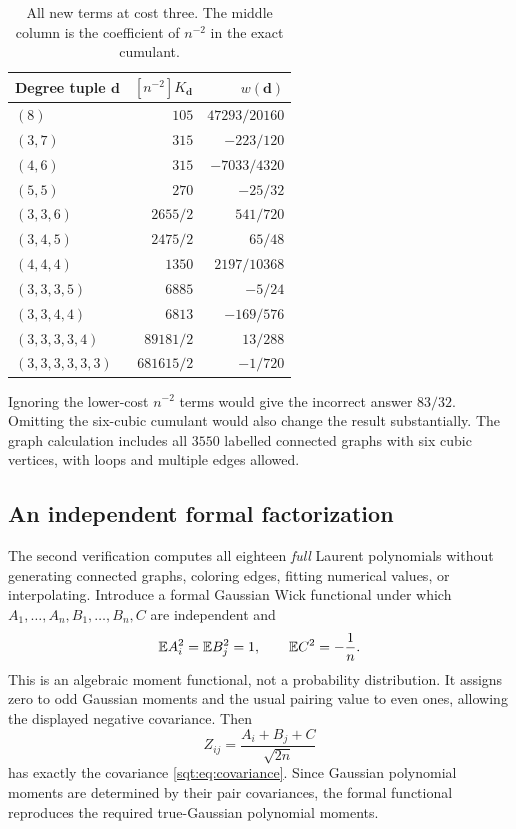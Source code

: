 \begin{table}[htbp]
\centering
\caption{All new terms at cost three. The middle column is the coefficient of $n^{-2}$ in the exact cumulant.}\label{sqt:tab:costthree}
\begin{tabular}{lrr}
\toprule
Degree tuple $\boldsymbol d$ & $[n^{-2}]K_{\boldsymbol d}$ & $w(\boldsymbol d)$\\
\midrule
$(8)$ & $105$ & $47293/20160$\\
$(3,7)$ & $315$ & $-223/120$\\
$(4,6)$ & $315$ & $-7033/4320$\\
$(5,5)$ & $270$ & $-25/32$\\
$(3,3,6)$ & $2655/2$ & $541/720$\\
$(3,4,5)$ & $2475/2$ & $65/48$\\
$(4,4,4)$ & $1350$ & $2197/10368$\\
$(3,3,3,5)$ & $6885$ & $-5/24$\\
$(3,3,4,4)$ & $6813$ & $-169/576$\\
$(3,3,3,3,4)$ & $89181/2$ & $13/288$\\
$(3,3,3,3,3,3)$ & $681615/2$ & $-1/720$\\
\bottomrule
\end{tabular}
\end{table}
Ignoring the lower-cost $n^{-2}$ terms would give the incorrect answer $83/32$. Omitting the six-cubic cumulant would also change the result substantially. The graph calculation includes all $3550$ labelled connected graphs with six cubic vertices, with loops and multiple edges allowed.

\subsection{An independent formal factorization}
The second verification computes all eighteen \emph{full} Laurent polynomials without generating connected graphs, coloring edges, fitting numerical values, or interpolating. Introduce a formal Gaussian Wick functional under which $A_1,\ldots,A_n,B_1,\ldots,B_n,C$ are independent and
\[
\mathbb E A_i^2=\mathbb E B_j^2=1,\qquad\mathbb E C^2=-\frac1n.
\]
This is an algebraic moment functional, not a probability distribution. It assigns zero to odd Gaussian moments and the usual pairing value to even ones, allowing the displayed negative covariance. Then
\[
Z_{ij}=\frac{A_i+B_j+C}{\sqrt{2n}}
\]
has exactly the covariance \eqref{sqt:eq:covariance}. Since Gaussian polynomial moments are determined by their pair covariances, the formal functional reproduces the required true-Gaussian polynomial moments.

